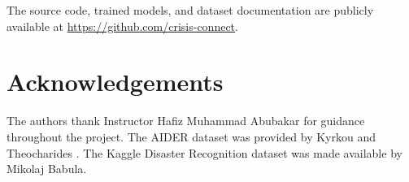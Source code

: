 \documentclass[conference]{IEEEtran}
\begin{document}
The source code, trained models, and dataset documentation are publicly available at \url{https://github.com/crisis-connect}.

\section*{Acknowledgements}

The authors thank Instructor Hafiz Muhammad Abubakar for guidance throughout the project. The AIDER dataset was provided by Kyrkou and Theocharides \cite{kyrkou2019aider}. The Kaggle Disaster Recognition dataset was made available by Mikolaj Babula.

\end{document}
